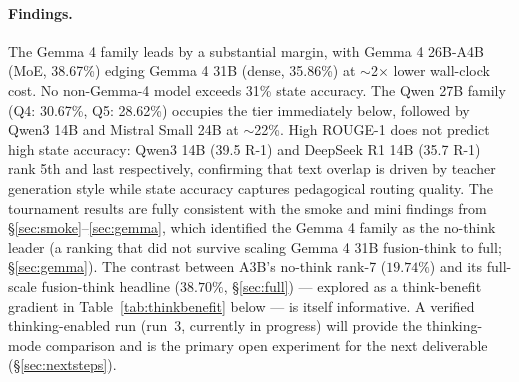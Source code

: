 \documentclass[11pt]{article}
\begin{document}
\paragraph{Findings.}
The Gemma 4 family leads by a substantial margin, with Gemma 4 26B-A4B (MoE, 38.67\%) edging Gemma 4 31B (dense, 35.86\%) at $\sim$2$\times$ lower wall-clock cost. No non-Gemma-4 model exceeds 31\% state accuracy. The Qwen 27B family (Q4: 30.67\%, Q5: 28.62\%) occupies the tier immediately below, followed by Qwen3 14B and Mistral Small 24B at $\sim$22\%. High ROUGE-1 does not predict high state accuracy: Qwen3 14B (39.5 R-1) and DeepSeek R1 14B (35.7 R-1) rank 5th and last respectively, confirming that text overlap is driven by teacher generation style while state accuracy captures pedagogical routing quality. The tournament results are fully consistent with the smoke and mini findings from \S\ref{sec:smoke}--\ref{sec:gemma}, which identified the Gemma 4 family as the no-think leader (a ranking that did not survive scaling Gemma 4 31B fusion-think to full; \S\ref{sec:gemma}). The contrast between A3B's no-think rank-7 ($19.74\%$) and its full-scale fusion-think headline ($38.70\%$, \S\ref{sec:full}) --- explored as a think-benefit gradient in Table~\ref{tab:thinkbenefit} below --- is itself informative. A verified thinking-enabled run (run~3, currently in progress) will provide the thinking-mode comparison and is the primary open experiment for the next deliverable (\S\ref{sec:nextsteps}).
\end{document}
